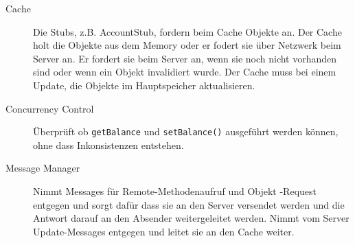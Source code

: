 \begin{description}
\item[Cache] Die Stubs, z.B. AccountStub, fordern beim Cache Objekte an. Der Cache holt die Objekte aus dem Memory oder er fodert sie über Netzwerk beim Server an. Er fordert sie beim Server an, wenn sie noch nicht vorhanden sind oder wenn ein Objekt invalidiert wurde. Der Cache muss bei einem Update, die Objekte im Hauptspeicher aktualisieren.
\item[Concurrency Control] Überprüft ob \verb+getBalance+ und \verb+setBalance()+ ausgeführt werden können, ohne dass Inkonsistenzen entstehen.

\item[Message Manager] Nimmt Messages für Remote-Methodenaufruf und Ob\-jekt\- -Request entgegen und sorgt dafür dass sie an den Server versendet werden und die Antwort darauf an den Absender weitergeleitet werden. Nimmt vom Server Update-Messages entgegen und leitet sie an den Cache weiter.

\end{description}

